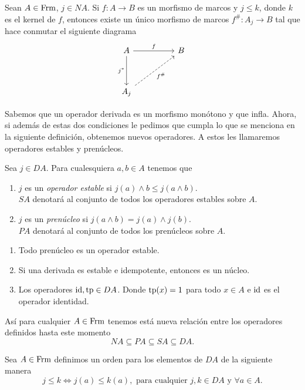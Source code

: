 \begin{thm}
Sean $A\in\mathrm{Frm}$, $j\in NA$. Si $f:A\to B$ es un morfismo de marcos y $j\leq k$, donde $k$ es el kernel de $f$, entonces existe un único morfismo de marcos $f^\#:A_j\to B$ tal que hace conmutar el siguiente diagrama
\[\begin{tikzcd}
	A && B \\
	\\
	{A_j}
	\arrow["f", from=1-1, to=1-3]
	\arrow["{j^*}"', from=1-1, to=3-1]
	\arrow["{f^\#}"', dashed, from=3-1, to=1-3]
\end{tikzcd}\]
\end{thm}

Sabemos que un operador derivada es un morfismo monótono y que infla. Ahora, si además de estas dos condiciones le pedimos que cumpla lo que se menciona en la siguiente definición, obtenemos nuevos operadores. A estos les llamaremos operadores estables y prenúcleos.

\begin{dfn}
Sea $j\in DA$. Para cualesquiera $a,b\in A$ tenemos que
\begin{enumerate}
\item $j$ es un \emph{operador estable} si $j(a)\wedge b\leq j(a \wedge b)$.\\
$SA$ denotará al conjunto de todos los operadores estables sobre $A$.

\item $j$ es un \emph{prenúcleo} si $j(a\wedge b)=j(a) \wedge j(b)$.\\
$PA$ denotará al conjunto de todos los prenúcleos sobre $A$.
\end{enumerate}
\end{dfn}

\begin{obs}
\noindent
\begin{enumerate}
\item Todo prenúcleo es un operador estable.
\item Si una derivada es estable e idempotente, entonces es un núcleo.
\item Los operadores $\mathrm{id}, \mathrm{tp}\in DA$. Donde $\mathrm{tp}(x)=1$ para todo $x\in A$ e $\mathrm{id}$ es el operador identidad.
\end{enumerate}
Así para cualquier $A\in \mathrm{Frm}$ tenemos está nueva relación entre los operadores definidos hasta este momento $$NA\subseteq PA\subseteq SA\subseteq DA.$$
\end{obs}

\begin{dfn}\label{OrdenDA}
Sea $A\in \mathrm{Frm}$ definimos un orden para los elementos de $DA$ de la siguiente manera
$$j\leq k\Leftrightarrow j(a)\leq k(a), \mbox{ para cualquier }j,k\in DA\mbox{  y  }\forall a\in A.$$
\end{dfn}


